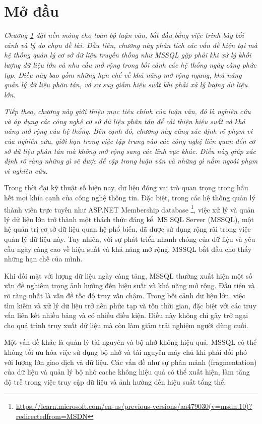 
\section{Mở đầu}
\label{sec:introduction}

\textit{Chương \ref{sec:introduction} đặt nền móng cho toàn bộ luận văn, bắt đầu bằng việc trình bày bối cảnh và lý do chọn đề tài. Đầu tiên, chương này phân tích các vấn đề hiện tại mà hệ thống quản lý cơ sở dữ liệu truyền thống như MSSQL gặp phải khi xử lý khối lượng dữ liệu lớn và nhu cầu mở rộng trong bối cảnh các hệ thống ngày càng phức tạp. Điều này bao gồm những hạn chế về khả năng mở rộng ngang, khả năng quản lý dữ liệu phân tán, và sự suy giảm hiệu suất khi phải xử lý lượng dữ liệu lớn.}

\textit{Tiếp theo, chương này giới thiệu mục tiêu chính của luận văn, đó là nghiên cứu và áp dụng các công nghệ cơ sở dữ liệu phân tán để cải thiện hiệu suất và khả năng mở rộng của hệ thống. Bên cạnh đó, chương này cũng xác định rõ phạm vi của nghiên cứu, giới hạn trong việc tập trung vào các công nghệ liên quan đến cơ sở dữ liệu phân tán mà không mở rộng sang các lĩnh vực khác. Điều này giúp xác định rõ ràng những gì sẽ được đề cập trong luận văn và những gì nằm ngoài phạm vi nghiên cứu.}


Trong thời đại kỹ thuật số hiện nay, dữ liệu đóng vai trò quan trọng trong hầu hết mọi khía cạnh của công nghệ thông tin. Đặc biệt, trong các hệ thống quản lý thành viên trực tuyến như ASP.NET Membership database \footnote{\url{https://learn.microsoft.com/en-us/previous-versions/aa479030(v=msdn.10)?redirectedfrom=MSDN}}, việc xử lý và quản lý dữ liệu lớn trở thành một thách thức đáng kể. MS SQL Server (MSSQL), một hệ quản trị cơ sở dữ liệu quan hệ phổ biến, đã được sử dụng rộng rãi trong việc quản lý dữ liệu này. Tuy nhiên, với sự phát triển nhanh chóng của dữ liệu và yêu cầu ngày càng cao về hiệu suất và khả năng mở rộng, MSSQL bắt đầu cho thấy những hạn chế của mình.

Khi đối mặt với lượng dữ liệu ngày càng tăng, MSSQL thường xuất hiện một số vấn đề nghiêm trọng ảnh hưởng đến hiệu suất và khả năng mở rộng. Đầu tiên và rõ ràng nhất là vấn đề tốc độ truy vấn chậm. Trong bối cảnh dữ liệu lớn, việc tìm kiếm và xử lý dữ liệu trở nên phức tạp và tốn thời gian, đặc biệt với các truy vấn liên kết nhiều bảng và có nhiều điều kiện. Điều này không chỉ gây trở ngại cho quá trình truy xuất dữ liệu mà còn làm giảm trải nghiệm người dùng cuối.

Một vấn đề khác là quản lý tài nguyên và bộ nhớ không hiệu quả. MSSQL có thể không tối ưu hóa việc sử dụng bộ nhớ và tài nguyên máy chủ khi phải đối phó với lượng lớn giao dịch và dữ liệu. Các vấn đề như sự phân mảnh (fragmentation) của dữ liệu và quản lý bộ nhớ cache không hiệu quả có thể xuất hiện, làm tăng độ trễ trong việc truy cập dữ liệu và ảnh hưởng đến hiệu suất tổng thể.

